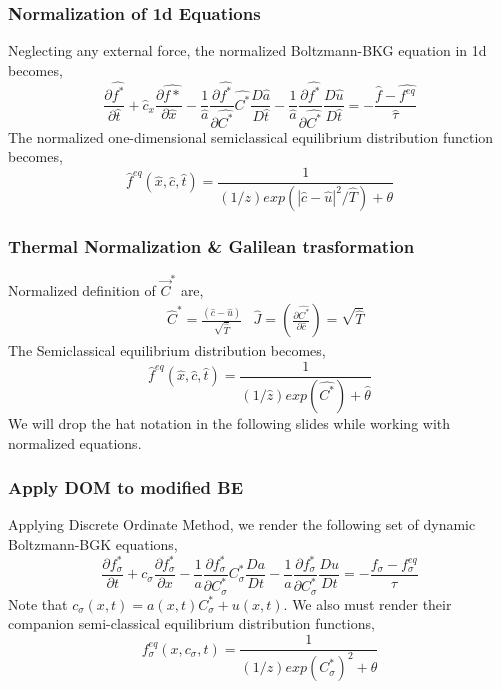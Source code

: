 \begin{frame}
	\frametitle{Normalization of 1d Equations}
	Neglecting any external force, the normalized Boltzmann-BKG equation in 1d becomes,
	\begin{equation}
	\frac{\partial \hat {f^*}}{\partial \hat t} + \hat c_x \frac{\partial \hat {f*}}{\partial \hat x} 
		- \frac{1}{\hat a} \frac{\partial \hat {f^*}}{\partial \hat {C^*}} \hat {C^*} \frac{D \hat a}{D \hat t}
		- \frac{1}{\hat a} \frac{\partial \hat {f^*}}{\partial \hat {C^*}} \frac{D \hat u}{D \hat t}
		= -\frac{\hat f - \hat {f^{eq}}}{\hat \tau}
	\end{equation}
	The normalized one-dimensional semiclassical equilibrium distribution function becomes,
	\begin{equation}
	\hat f^{eq} (\hat x,\hat c,\hat t) = \frac{1}{(1/z) exp(\left | \hat c - \hat u \right |^2 / \hat T)+\theta}
\end{equation}
\end{frame}

\begin{frame}
	\frametitle{Thermal Normalization \& Galilean trasformation}
	Normalized definition of $\vec{C}^*$ are,
	\begin{align*}
	&\hat C^* = \frac{(\hat c-\hat u)}{\sqrt{\hat T}} & \hat J = \left(\frac{\partial \hat {C^*}}{\partial \hat c} \right ) = \sqrt{\hat T} 
	\end{align*}
	The Semiclassical equilibrium distribution becomes,
	\begin{equation}
		\hat f^{eq} (\hat x,\hat c,\hat t) = \frac{1}{(1/ \hat z) exp(\hat {C^*})+\hat \theta}
	\label{eq:normadistf1d}
	\end{equation}
	We will drop the hat notation in the following slides while working with normalized equations.
\end{frame}

\begin{frame}
	\frametitle{Apply DOM to modified BE}
	Applying Discrete Ordinate Method, we render the following set of dynamic Boltzmann-BGK equations,
	\begin{equation}
	\frac{\partial {f_\sigma^*}}{\partial t} + c_\sigma \frac{\partial f_\sigma^*}{\partial x} 
		- \frac{1}{a} \frac{\partial f_\sigma^*}{\partial C_\sigma^*} C_\sigma^* \frac{Da}{Dt}
		- \frac{1}{a} \frac{\partial f_\sigma^*}{\partial C_\sigma^*} \frac{Du}{Dt}
		= -\frac{f_\sigma - f_\sigma^{eq}}{\tau}
	\end{equation}
	Note that $c_\sigma(x,t) = a(x,t) C_\sigma^* + u(x,t)$. We also must render their companion semi-classical equilibrium distribution functions,
	\begin{equation}
	f_\sigma^{eq} (x,c_\sigma,t) = \frac{1}{(1/z) exp(C_\sigma^*)^2 + \theta}
	\end{equation}
\end{frame}


